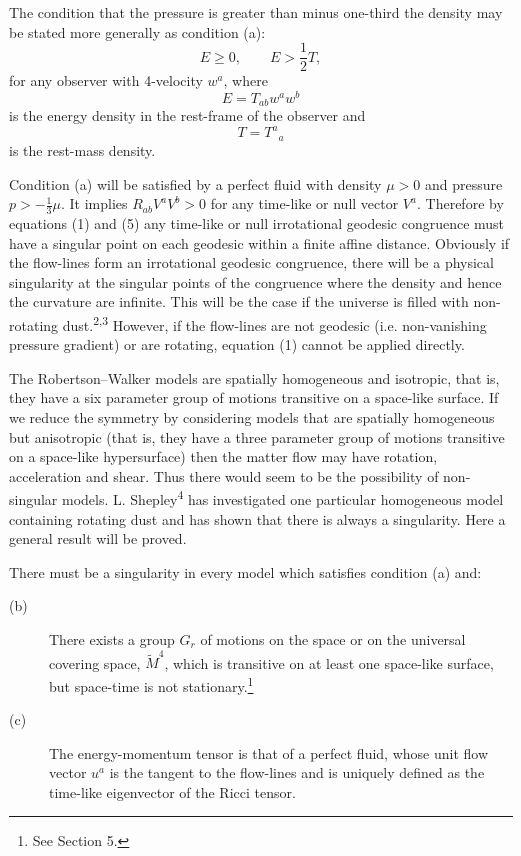 The condition that the pressure is greater than minus one-third the density
may be stated more generally as condition (a):
\begin{equation*}
\tag{a}
E\geq 0,
\qquad
E>\frac{1}{2}T,
\end{equation*}
for any observer with 4-velocity $w^a$, where
\[
E=T_{ab}w^aw^b
\]
is the energy density in the rest-frame of the observer and
\[
T=T^a{}_a
\]
is the rest-mass density.

Condition (a) will be satisfied by a perfect fluid with density $\mu>0$ and
pressure $p>-\frac{1}{3}\mu$. It implies $R_{ab}V^aV^b>0$ for any time-like or
null vector $V^a$. Therefore by equations (1) and (5) any time-like or null
irrotational geodesic congruence must have a singular point on each geodesic
within a finite affine distance. Obviously if the flow-lines form an
irrotational geodesic congruence, there will be a physical singularity at the
singular points of the congruence where the density and hence the curvature
are infinite. This will be the case if the universe is filled with
non-rotating dust.\textsuperscript{2,3} However, if the flow-lines are not
geodesic (i.e. non-vanishing pressure gradient) or are rotating, equation (1)
cannot be applied directly.


The Robertson--Walker models are spatially homogeneous and isotropic, that
is, they have a six parameter group of motions transitive on a space-like
surface. If we reduce the symmetry by considering models that are spatially
homogeneous but anisotropic (that is, they have a three parameter group of
motions transitive on a space-like hypersurface) then the matter flow may have
rotation, acceleration and shear. Thus there would seem to be the possibility
of non-singular models. L. Shepley\textsuperscript{4} has investigated one
particular homogeneous model containing rotating dust and has shown that
there is always a singularity. Here a general result will be proved.

There must be a singularity in every model which satisfies condition (a) and:

\begin{description}
\item[(b)] There exists a group $G_r$ of motions on the space or on the
universal covering space, $\widetilde{M}^4$, which is transitive on at least
one space-like surface, but space-time is not stationary.\footnote{See
Section 5.}

\item[(c)] The energy-momentum tensor is that of a perfect fluid, whose unit
flow vector $u^a$ is the tangent to the flow-lines and is uniquely defined as
the time-like eigenvector of the Ricci tensor.
\end{description}

